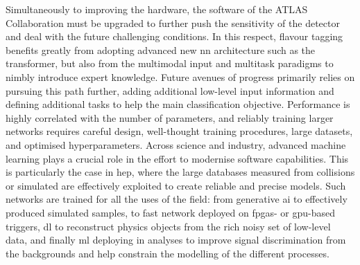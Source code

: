 Simultaneously to improving the hardware, the software of the ATLAS Collaboration must be upgraded to further push the sensitivity of the detector and deal with the future challenging conditions. In this respect, flavour tagging benefits greatly from adopting advanced new \gls{nn} architecture such as the transformer, but also from the multimodal input and multitask paradigms to nimbly introduce expert knowledge. Future avenues of progress primarily relies on pursuing this path further, adding additional low-level input information and defining additional tasks to help the main classification objective. Performance is highly correlated with the number of parameters, and reliably training larger networks requires careful design, well-thought training procedures, large datasets, and optimised hyperparameters. Across science and industry, advanced machine learning plays a crucial role in the effort to modernise software capabilities. This is particularly the case in \gls{hep}, where the large databases measured from collisions or simulated are effectively exploited to create reliable and precise models. Such networks are trained for all the uses of the field: from generative \gls{ai} to effectively produced simulated samples, to fast network deployed on \glspl{fpga}- or \gls{gpu}-based triggers, \gls{dl} to reconstruct physics objects from the rich noisy set of low-level data, and finally \gls{ml} deploying in analyses to improve signal discrimination from the backgrounds and help constrain the modelling of the different processes. 